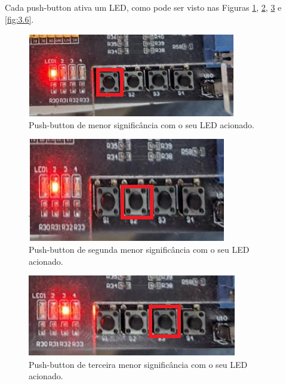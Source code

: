 Cada push-button ativa um LED, como pode ser visto nas Figuras \ref{fig:3.3}, \ref{fig:3.4}, \ref{fig:3.5} e \ref{fig:3.6}.

\begin{figure}[H]
	\centering
	\includegraphics[width=1\columnwidth]{FIGURAS/cap_3/pb1.png}
	\caption{Push-button de menor significância com o seu LED acionado.}
        \label{fig:3.3}
\end{figure}

\begin{figure}[H]
	\centering
	\includegraphics[width=1\columnwidth]{FIGURAS/cap_3/pb2.png}
	\caption{Push-button de segunda menor significância com o seu LED acionado.}
        \label{fig:3.4}
\end{figure}

\begin{figure}[H]
	\centering
	\includegraphics[width=1\columnwidth]{FIGURAS/cap_3/pb3.png}
	\caption{Push-button de terceira menor significância com o seu LED acionado.}
        \label{fig:3.5}
\end{figure}


